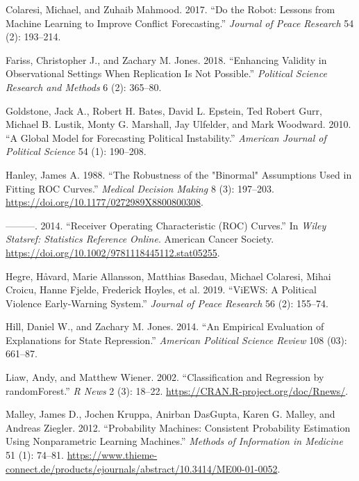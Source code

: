 \documentclass[
]{article}
\newlength{\cslhangindent}
\newenvironment{cslreferences}%
  {\setlength{\parindent}{0pt}%
  \everypar{\setlength{\hangindent}{\cslhangindent}}\ignorespaces}%
  {\par}
\begin{document}
\begin{cslreferences}
\leavevmode\hypertarget{ref-colaresi:mahmood:2017}{}%
Colaresi, Michael, and Zuhaib Mahmood. 2017. ``Do the Robot: Lessons from Machine Learning to Improve Conflict Forecasting.'' \emph{Journal of Peace Research} 54 (2): 193--214.

\leavevmode\hypertarget{ref-fariss:jones:2018}{}%
Fariss, Christopher J., and Zachary M. Jones. 2018. ``Enhancing Validity in Observational Settings When Replication Is Not Possible.'' \emph{Political Science Research and Methods} 6 (2): 365--80.

\leavevmode\hypertarget{ref-goldstone:etal:2010}{}%
Goldstone, Jack A., Robert H. Bates, David L. Epstein, Ted Robert Gurr, Michael B. Lustik, Monty G. Marshall, Jay Ulfelder, and Mark Woodward. 2010. ``A Global Model for Forecasting Political Instability.'' \emph{American Journal of Political Science} 54 (1): 190--208.

\leavevmode\hypertarget{ref-henley:1988}{}%
Hanley, James A. 1988. ``The Robustness of the "Binormal" Assumptions Used in Fitting ROC Curves.'' \emph{Medical Decision Making} 8 (3): 197--203. \url{https://doi.org/10.1177/0272989X8800800308}.

\leavevmode\hypertarget{ref-henley:2014}{}%
---------. 2014. ``Receiver Operating Characteristic (ROC) Curves.'' In \emph{Wiley Statsref: Statistics Reference Online}. American Cancer Society. \url{https://doi.org/10.1002/9781118445112.stat05255}.

\leavevmode\hypertarget{ref-hegre:etal:2019}{}%
Hegre, Håvard, Marie Allansson, Matthias Basedau, Michael Colaresi, Mihai Croicu, Hanne Fjelde, Frederick Hoyles, et al. 2019. ``ViEWS: A Political Violence Early-Warning System.'' \emph{Journal of Peace Research} 56 (2): 155--74.

\leavevmode\hypertarget{ref-hill:jones:2014}{}%
Hill, Daniel W., and Zachary M. Jones. 2014. ``An Empirical Evaluation of Explanations for State Repression.'' \emph{American Political Science Review} 108 (03): 661--87.

\leavevmode\hypertarget{ref-liaw:wiener:2002}{}%
Liaw, Andy, and Matthew Wiener. 2002. ``Classification and Regression by randomForest.'' \emph{R News} 2 (3): 18--22. \url{https://CRAN.R-project.org/doc/Rnews/}.

\leavevmode\hypertarget{ref-malley:etal:2012}{}%
Malley, James D., Jochen Kruppa, Anirban DasGupta, Karen G. Malley, and Andreas Ziegler. 2012. ``Probability Machines: Consistent Probability Estimation Using Nonparametric Learning Machines.'' \emph{Methods of Information in Medicine} 51 (1): 74--81. \url{https://www.thieme-connect.de/products/ejournals/abstract/10.3414/ME00-01-0052}.


\end{cslreferences}
\end{document}
